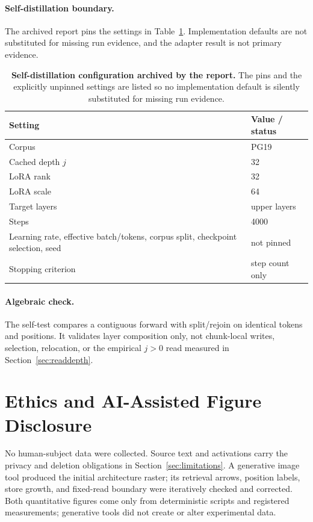 \FloatBarrier

\paragraph{Self-distillation boundary.}
The archived report pins the settings in
Table~\ref{tab:selfdistill-config}.  Implementation defaults are not
substituted for missing run evidence, and the adapter result is not primary
evidence.

\begin{table}[htbp]
\centering
\small
\setlength{\tabcolsep}{4pt}
\begin{tabular}{@{}p{}p{}@{}}
\toprule
\textbf{Setting} & \textbf{Value / status} \\
\midrule
Corpus & PG19 \\
Cached depth $j$ & 32 \\
LoRA rank & 32 \\
LoRA scale & 64 \\
Target layers & upper layers \\
Steps & 4000 \\
Learning rate, effective batch/tokens, corpus split, checkpoint selection, seed & not pinned \\
Stopping criterion & step count only \\
\bottomrule
\end{tabular}
\caption{\textbf{Self-distillation configuration archived by the report.}
The pins and the explicitly unpinned settings are listed so no implementation
default is silently substituted for missing run evidence.}
\label{tab:selfdistill-config}
\end{table}

\FloatBarrier

\paragraph{Algebraic check.}
The self-test compares a contiguous forward with split/rejoin on identical
tokens and positions.  It validates layer composition only, not chunk-local
writes, selection, relocation, or the empirical $j>0$ read measured in
Section~\ref{sec:readdepth}.

\section{Ethics and AI-Assisted Figure Disclosure}
No human-subject data were collected.  Source text and activations carry the
privacy and deletion obligations in Section~\ref{sec:limitations}.  A
generative image tool produced the initial architecture raster; its retrieval
arrows, position labels, store growth, and fixed-read boundary were iteratively
checked and corrected.  Both quantitative figures come only from deterministic
scripts and registered measurements; generative tools did not create or alter
experimental data.

